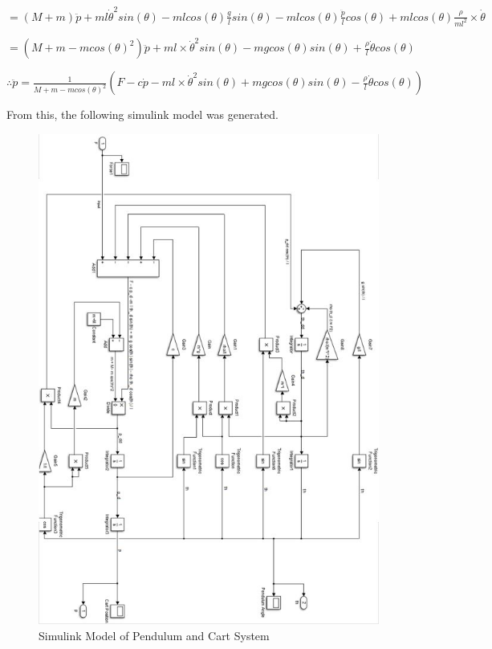 \documentclass[12pt]{article}
\begin{document}
\vspace{\baselineskip}


$= (M + m) \ddot{p} + m l \dot{\theta}^2 sin(\theta) - ml cos(\theta) \frac{g}{l} sin(\theta) - m l cos(\theta) \frac{\ddot{p}}{l} cos(\theta) + m l cos(\theta) \frac{\rho}{m l^2} \times \dot{\theta}$


\vspace{\baselineskip}


$= (M + m -m cos(\theta)^2) \ddot{p} + m l \times \dot{\theta}^2 sin(\theta) - m g 
cos(\theta) sin(\theta) + \frac{\rho}{l} \dot{\theta} cos(\theta)$


\vspace{\baselineskip}


$\therefore \ddot{p} = \frac{1}{M + m -m cos(\theta)^2}  (F - c \dot{p} - m l \times \dot{\theta}^2 sin(\theta) + m g cos(\theta) sin(\theta) - \frac{\rho}{l} \dot{\theta} cos(\theta))$


\vspace{\baselineskip}


From this, the following simulink model was generated.


\vspace{\baselineskip}

\begin{center}
\begin{figure}[htb]
	\includegraphics[width=1\textwidth]{PBA3_2_model_LS_3.jpg}
\caption{Simulink Model of Pendulum and Cart System}
\end{figure}
\end{center}
\end{document}
